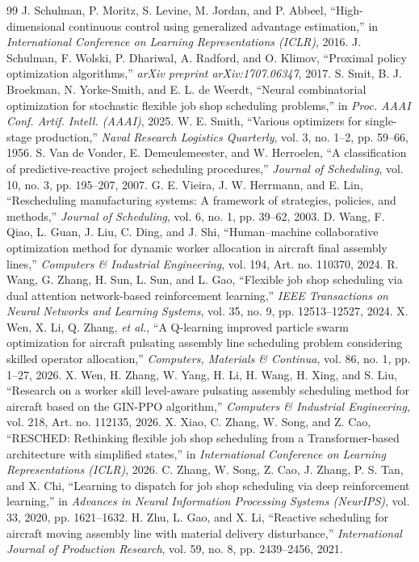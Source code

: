 \documentclass[journal,10pt]{IEEEtran}
\begin{document}
\begin{thebibliography}{99}
 J. Schulman, P. Moritz, S. Levine, M. Jordan, and P. Abbeel, ``High-dimensional continuous control using generalized advantage estimation,'' in \emph{International Conference on Learning Representations (ICLR)}, 2016.
 J. Schulman, F. Wolski, P. Dhariwal, A. Radford, and O. Klimov, ``Proximal policy optimization algorithms,'' \emph{arXiv preprint arXiv:1707.06347}, 2017.
 S. Smit, B. J. Broekman, N. Yorke-Smith, and E. L. de Weerdt, ``Neural combinatorial optimization for stochastic flexible job shop scheduling problems,'' in \emph{Proc. AAAI Conf. Artif. Intell. (AAAI)}, 2025.
 W. E. Smith, ``Various optimizers for single-stage production,'' \emph{Naval Research Logistics Quarterly}, vol. 3, no. 1--2, pp. 59--66, 1956.
 S. Van de Vonder, E. Demeulemeester, and W. Herroelen, ``A classification of predictive-reactive project scheduling procedures,'' \emph{Journal of Scheduling}, vol. 10, no. 3, pp. 195--207, 2007.
 G. E. Vieira, J. W. Herrmann, and E. Lin, ``Rescheduling manufacturing systems: A framework of strategies, policies, and methods,'' \emph{Journal of Scheduling}, vol. 6, no. 1, pp. 39--62, 2003.
 D. Wang, F. Qiao, L. Guan, J. Liu, C. Ding, and J. Shi, ``Human--machine collaborative optimization method for dynamic worker allocation in aircraft final assembly lines,'' \emph{Computers \& Industrial Engineering}, vol. 194, Art. no. 110370, 2024.
 R. Wang, G. Zhang, H. Sun, L. Sun, and L. Gao, ``Flexible job shop scheduling via dual attention network-based reinforcement learning,'' \emph{IEEE Transactions on Neural Networks and Learning Systems}, vol. 35, no. 9, pp. 12513--12527, 2024.
 X. Wen, X. Li, Q. Zhang, \emph{et al.}, ``A Q-learning improved particle swarm optimization for aircraft pulsating assembly line scheduling problem considering skilled operator allocation,'' \emph{Computers, Materials \& Continua}, vol. 86, no. 1, pp. 1--27, 2026.
 X. Wen, H. Zhang, W. Yang, H. Li, H. Wang, H. Xing, and S. Liu, ``Research on a worker skill level-aware pulsating assembly scheduling method for aircraft based on the GIN-PPO algorithm,'' \emph{Computers \& Industrial Engineering}, vol. 218, Art. no. 112135, 2026.
 X. Xiao, C. Zhang, W. Song, and Z. Cao, ``RESCHED: Rethinking flexible job shop scheduling from a Transformer-based architecture with simplified states,'' in \emph{International Conference on Learning Representations (ICLR)}, 2026.
 C. Zhang, W. Song, Z. Cao, J. Zhang, P. S. Tan, and X. Chi, ``Learning to dispatch for job shop scheduling via deep reinforcement learning,'' in \emph{Advances in Neural Information Processing Systems (NeurIPS)}, vol. 33, 2020, pp. 1621--1632.
 H. Zhu, L. Gao, and X. Li, ``Reactive scheduling for aircraft moving assembly line with material delivery disturbance,'' \emph{International Journal of Production Research}, vol. 59, no. 8, pp. 2439--2456, 2021.
\end{thebibliography}
\end{document}
